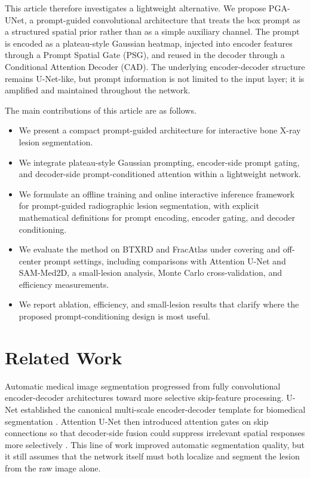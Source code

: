\documentclass{ieeeaccess}
\begin{document}
This article therefore investigates a lightweight alternative. We propose PGA-UNet, a prompt-guided convolutional architecture that treats the box prompt as a structured spatial prior rather than as a simple auxiliary channel. The prompt is encoded as a plateau-style Gaussian heatmap, injected into encoder features through a Prompt Spatial Gate (PSG), and reused in the decoder through a Conditional Attention Decoder (CAD). The underlying encoder-decoder structure remains U-Net-like, but prompt information is not limited to the input layer; it is amplified and maintained throughout the network.

The main contributions of this article are as follows.
\begin{itemize}
\item We present a compact prompt-guided architecture for interactive bone X-ray lesion segmentation.
\item We integrate plateau-style Gaussian prompting, encoder-side prompt gating, and decoder-side prompt-conditioned attention within a lightweight network.
\item We formulate an offline training and online interactive inference framework for prompt-guided radiographic lesion segmentation, with explicit mathematical definitions for prompt encoding, encoder gating, and decoder conditioning.
\item We evaluate the method on BTXRD and FracAtlas under covering and off-center prompt settings, including comparisons with Attention U-Net and SAM-Med2D, a small-lesion analysis, Monte Carlo cross-validation, and efficiency measurements.
\item We report ablation, efficiency, and small-lesion results that clarify where the proposed prompt-conditioning design is most useful.
\end{itemize}

\section{Related Work}
Automatic medical image segmentation progressed from fully convolutional encoder-decoder architectures toward more selective skip-feature processing. U-Net established the canonical multi-scale encoder-decoder template for biomedical segmentation \cite{b3}. Attention U-Net then introduced attention gates on skip connections so that decoder-side fusion could suppress irrelevant spatial responses more selectively \cite{b4}. This line of work improved automatic segmentation quality, but it still assumes that the network itself must both localize and segment the lesion from the raw image alone.
\end{document}
